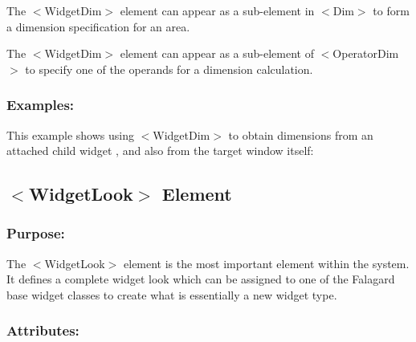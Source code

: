 \begin{DoxyItemize}
\item The {\ttfamily $<$Widget\+Dim$>$} element can appear as a sub-\/element in {\ttfamily $<$Dim$>$} to form a dimension specification for an area. 
\item The {\ttfamily $<$Widget\+Dim$>$} element can appear as a sub-\/element of {\ttfamily $<$Operator\+Dim$>$} to specify one of the operands for a dimension calculation. 
\end{DoxyItemize}\hypertarget{fal_element_ref_fal_elem_ref_sec_38_4}{}\subsubsection{Examples\+:}\label{fal_element_ref_fal_elem_ref_sec_38_4}
This example shows using {\ttfamily $<$Widget\+Dim$>$} to obtain dimensions from an attached child widget \textquotesingle{}, and also from the target window itself\+: 
\begin{DoxyCode}{0}
\end{DoxyCode}
\hypertarget{fal_element_ref_fal_elem_ref_sec_39}{}\subsection{$<$\+Widget\+Look$>$ Element}\label{fal_element_ref_fal_elem_ref_sec_39}
\hypertarget{fal_element_ref_fal_elem_ref_sec_39_1}{}\subsubsection{Purpose\+:}\label{fal_element_ref_fal_elem_ref_sec_39_1}
The {\ttfamily $<$Widget\+Look$>$} element is the most important element within the system. It defines a complete widget \textquotesingle{}look\textquotesingle{} which can be assigned to one of the Falagard base widget classes to create what is essentially a new widget type.\hypertarget{fal_element_ref_fal_elem_ref_sec_39_2}{}\subsubsection{Attributes\+:}\label{fal_element_ref_fal_elem_ref_sec_39_2}
